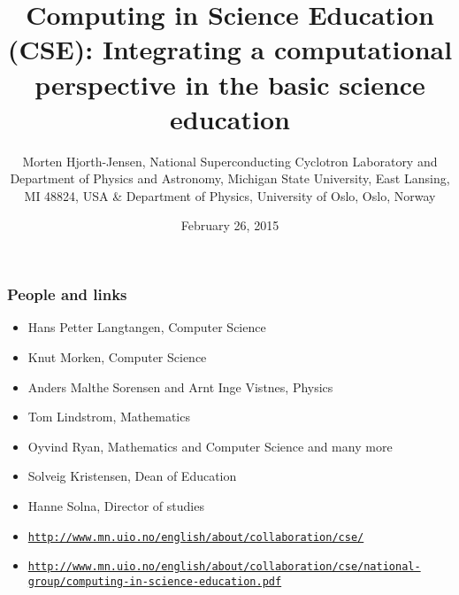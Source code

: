 \documentclass{beamer}
\begin{document}




\title{Computing in Science Education (CSE): Integrating a computational perspective in the basic science education}


\author{Morten Hjorth-Jensen, National Superconducting Cyclotron Laboratory and Department of Physics and Astronomy, Michigan State University, East Lansing, MI 48824, USA {\&} Department of Physics, University of Oslo, Oslo, Norway\inst{}}
\institute{}

\date{February 26, 2015
}

\begin{frame}
\titlepage
\end{frame}

\begin{frame}
\frametitle{People and links}

\begin{block}{}
\begin{itemize}
\item Hans Petter Langtangen, Computer Science

\item Knut Morken, Computer Science

\item Anders Malthe Sorensen and Arnt Inge Vistnes, Physics

\item Tom Lindstrom, Mathematics

\item Oyvind Ryan, Mathematics and Computer Science and many more

\item Solveig Kristensen, Dean of Education

\item Hanne Solna, Director of studies

\item \href{{http://www.mn.uio.no/english/about/collaboration/cse/}}{\nolinkurl{http://www.mn.uio.no/english/about/collaboration/cse/}}

\item \href{{http://www.mn.uio.no/english/about/collaboration/cse/national-group/computing-in-science-education.pdf}}{\nolinkurl{http://www.mn.uio.no/english/about/collaboration/cse/national-group/computing-in-science-education.pdf}}
\end{itemize}

\noindent
\end{block}
\end{frame}
\end{document}
